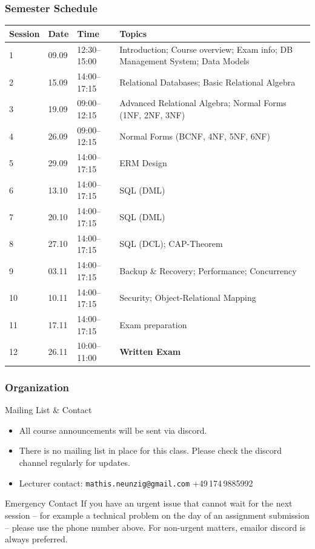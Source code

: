 \begin{frame}
  \frametitle{Semester Schedule}

  \scriptsize
  \begin{tabularx}{\linewidth}{@{}l l l X@{}}
    \toprule
    \textbf{Session} & \textbf{Date} & \textbf{Time} & \textbf{Topics} \\
    \midrule
    1  & 09.09 & 12:30--15:00 & Introduction; Course overview; Exam info; DB Management System; Data Models \\
    2  & 15.09 & 14:00--17:15 & Relational Databases; Basic Relational Algebra \\
    3  & 19.09 & 09:00--12:15 & Advanced Relational Algebra; Normal Forms (1NF, 2NF, 3NF) \\
    4  & 26.09 & 09:00--12:15 & Normal Forms (BCNF, 4NF, 5NF, 6NF) \\
    5  & 29.09 & 14:00--17:15 & ERM Design \\
    6  & 13.10 & 14:00--17:15 & SQL (DML) \\
    7  & 20.10 & 14:00--17:15 & SQL (DML) \\
    8  & 27.10 & 14:00--17:15 & SQL (DCL); CAP-Theorem \\
    9  & 03.11 & 14:00--17:15 & Backup \& Recovery; Performance; Concurrency \\
    10 & 10.11 & 14:00--17:15 & Security; Object-Relational Mapping \\
    11 & 17.11 & 14:00--17:15 & Exam preparation \\
    12 & 26.11 & 10:00--11:00 & \textbf{Written Exam} \\
    \bottomrule
  \end{tabularx}

\end{frame}

\begin{frame}
  \frametitle{Organization}

  \begin{block}{Mailing List \& Contact}
    \begin{itemize}
      \item All course announcements will be sent via discord.
      \item There is no mailing list in place for this class. Please check the discord channel regularly for updates.
      \item Lecturer contact: \texttt{mathis.neunzig@gmail.com} \quad +49\,174\,9885992
    \end{itemize}
  \end{block}

  \begin{alertblock}{Emergency Contact}
    If you have an urgent issue that cannot wait for the next session -- for example a technical problem on the day of an assignment submission -- please use the phone number above. For non-urgent matters, emailor discord is always preferred.
  \end{alertblock}
\end{frame}

